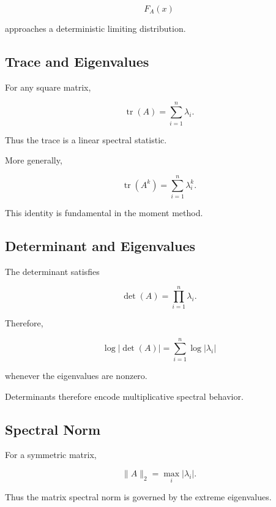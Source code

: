 \[
F_A(x)
\]

approaches a deterministic limiting distribution.

\subsection{Trace and Eigenvalues}
\label{subsec:trace-random-matrices}

For any square matrix,

\[
\boxed{
\operatorname{tr}(A)
=
\sum_{i=1}^{n}\lambda_i.
}
\]

Thus the trace is a linear spectral statistic.

More generally,

\[
\boxed{
\operatorname{tr}(A^k)
=
\sum_{i=1}^{n}\lambda_i^k.
}
\]

This identity is fundamental in the moment method.

\subsection{Determinant and Eigenvalues}
\label{subsec:determinant-random-matrices}

The determinant satisfies

\[
\boxed{
\det(A)
=
\prod_{i=1}^{n}\lambda_i.
}
\]

Therefore,

\[
\log|\det(A)|
=
\sum_{i=1}^{n}
\log|\lambda_i|
\]

whenever the eigenvalues are nonzero.

Determinants therefore encode multiplicative spectral behavior.

\subsection{Spectral Norm}
\label{subsec:spectral-norm-random}

For a symmetric matrix,

\[
\boxed{
\|A\|_2
=
\max_i|\lambda_i|.
}
\]

Thus the matrix spectral norm is governed by the extreme eigenvalues.


